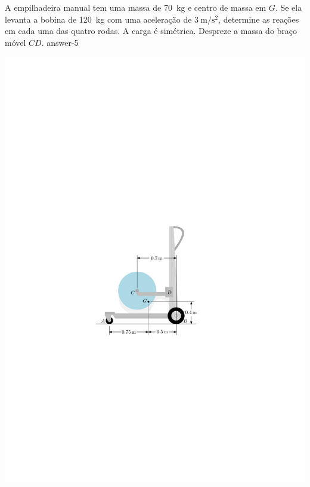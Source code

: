 \begin{multicols}{2}
	\item A empilhadeira manual tem uma massa de \SI{70}{\kilogram} e centro de massa em $G$. Se ela levanta a bobina de \SI{120}{\kilogram} com uma aceleração de $\SI{3}{\meter/\second^{2}}$, determine as reações em cada uma das quatro rodas. A carga é simétrica. Despreze a massa do braço móvel $CD$.\newline
	{answer-5}
	
	\columnbreak
	
	\begin{flushright}
		\includegraphics[scale=1.15]{../../images/draw_4}
	\end{flushright}
\end{multicols}